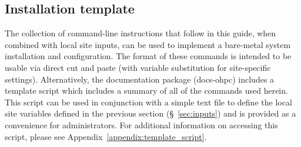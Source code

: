\subsection{Installation template}
The collection of command-line instructions that follow in this guide, when
combined with local site inputs, can be used to implement a 
bare-metal system installation and configuration. The format of these commands
is intended to be usable via direct cut and paste (with variable substitution
for site-specific settings). Alternatively, the \OHPC{} documentation package
(docs-ohpc) includes a template script which includes a summary of all of the 
commands used herein. This script can be used in conjunction with a simple text 
file to define the local site variables defined in the previous section
(\S~\ref{sec:inputs}) and is provided as a convenience for administrators. For
additional information on accessing this script, please see
Appendix~\ref{appendix:template_script}.

